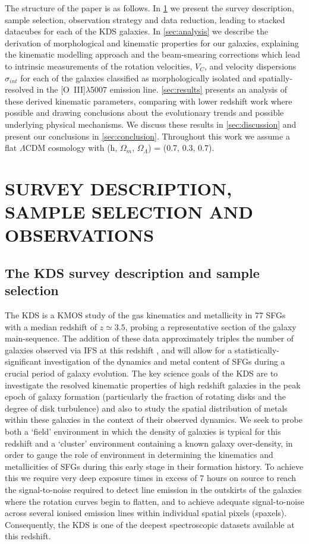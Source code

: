 \documentclass[fleqn,usenatbib]{mnras}
\begin{document}
\noindent
The structure of the paper is as follows.
In \cref{sec:Survey_and_data} we present the survey description, sample selection, observation strategy and data reduction, leading to stacked datacubes for each of the KDS galaxies.
In \cref{sec:analysis} we describe the derivation of morphological and kinematic properties for our galaxies, explaining the kinematic modelling approach and the beam-smearing corrections which lead to intrinsic measurements of the rotation velocities, $V_{C}$, and velocity dispersions $\sigma_{int}$ for each of the galaxies classified as morphologically isolated and spatially-resolved in the [O~{\sc III}]$\lambda$5007 emission line.
\cref{sec:results} presents an analysis of these derived kinematic parameters, comparing with lower redshift work where possible and drawing conclusions about the evolutionary trends and possible underlying physical mechanisms.
We discuss these results in \cref{sec:discussion} and present our conclusions in \cref{sec:conclusion}.
Throughout this work we assume a flat $\Lambda$CDM cosmology with (h, $\Omega_{m}$, $\Omega_{\Lambda}$) = (0.7, 0.3, 0.7). 

\section{SURVEY DESCRIPTION, SAMPLE SELECTION AND OBSERVATIONS}\label{sec:Survey_and_data}
\subsection{The KDS survey description and sample selection}\label{subsec:survey_intro}
The KDS is a KMOS study of the gas kinematics and metallicity in 77 SFGs with a median redshift of $z\simeq3.5$, probing a representative section of the galaxy main-sequence.
The addition of these data approximately triples the number of galaxies observed via IFS at this redshift \citep{Cresci2010,Lemoine-Busserolle2010,Gnerucci2011}, and will allow for a statistically-significant investigation of the dynamics and metal content of SFGs during a crucial period of galaxy evolution. 
The key science goals of the KDS are to investigate the resolved kinematic properties of high redshift galaxies in the peak epoch of galaxy formation (particularly the fraction of rotating disks and the degree of disk turbulence) and also to study the spatial distribution of metals within these galaxies in the context of their observed dynamics.
We seek to probe both a `field' environment in which the density of galaxies is typical for this redshift and a `cluster' environment containing a known galaxy over-density, in order to gauge the role of environment in determining the kinematics and metallicities of SFGs during this early stage in their formation history.
To achieve this we require very deep exposure times in excess of 7 hours on source to reach the signal-to-noise required to detect line emission in the outskirts of the galaxies where the rotation curves begin to flatten, and to achieve adequate signal-to-noise across several ionised emission lines within individual spatial pixels (spaxels).
Consequently, the KDS is one of the deepest spectroscopic datasets available at this redshift. 
\end{document}
